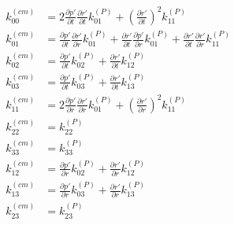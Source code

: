\documentclass[10pt,letterpaper]{article}
\begin{document}
\begin{align}
k^{(cm)}_{00} &= 2 \frac{\partial p'}{\partial t} \frac{\partial r'}{\partial t} k^{(P)}_{01} + \left(\frac{\partial r'}{\partial t}\right)^2 k^{(P)}_{11}\nonumber\\
k^{(cm)}_{01} &=\frac{\partial p'}{\partial t} \frac{\partial r'}{\partial r} k^{(P)}_{01}+\frac{\partial r'}{\partial t} \frac{\partial p'}{\partial r} k^{(P)}_{01}+\frac{\partial r'}{\partial t} \frac{\partial r'}{\partial r} k^{(P)}_{11} \nonumber\\
k^{(cm)}_{02} &= \frac{\partial p'}{\partial t} k^{(P)}_{02}+\frac{\partial r'}{\partial t} k^{(P)}_{12} \nonumber\\
k^{(cm)}_{03} &= \frac{\partial p'}{\partial t} k^{(P)}_{03}+\frac{\partial r'}{\partial t} k^{(P)}_{13} \nonumber\\
k^{(cm)}_{11} &=2 \frac{\partial p'}{\partial r} \frac{\partial r'}{\partial r} k^{(P)}_{01}+\left(\frac{\partial r'}{\partial r}\right)^2 k^{(P)}_{11} \nonumber\\
k^{(cm)}_{22} &= k^{(P)}_{22}\nonumber\\
k^{(cm)}_{33} &= k^{(P)}_{33}\nonumber\\
k^{(cm)}_{12} &= \frac{\partial p'}{\partial r} k^{(P)}_{02}+\frac{\partial r'}{\partial r} k^{(P)}_{12} \nonumber\\
k^{(cm)}_{13} &= \frac{\partial p'}{\partial r} k^{(P)}_{03}+\frac{\partial r'}{\partial r} k^{(P)}_{13} \nonumber\\
k^{(cm)}_{23} &= k^{(P)}_{23}
\end{align}
\end{document}
